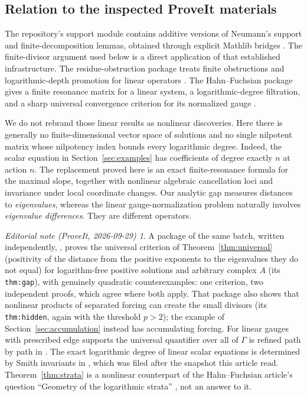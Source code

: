 \documentclass[11pt,a4paper]{article}
\numberwithin{equation}{section}
\theoremstyle{definition}
\theoremstyle{remark}
\newtheorem*{ednote}{Editorial note (ProveIt, 2026-09-29)}
\newcommand{\G}{\Gamma}
\begin{document}
\subsection{Relation to the inspected ProveIt materials}
The repository's support module contains additive versions of Neumann's
support and finite-decomposition lemmas, obtained through explicit
Mathlib bridges \cite{repo-support}. The finite-divisor argument used
below is a direct application of that established infrastructure.
The residue-obstruction package treats finite obstructions and
logarithmic-depth promotion for linear operators
\cite{repo-residue}. The Hahn--Fuchsian package gives a finite resonance
matrix for a linear system, a logarithmic-degree filtration, and a sharp
universal convergence criterion for its normalized gauge
\cite{repo-fuchsian}.

We do not rebrand those linear results as nonlinear discoveries. Here
there is generally no finite-dimensional vector space of solutions and
no single nilpotent matrix whose nilpotency index bounds every
logarithmic degree. Indeed, the scalar equation in
Section~\ref{sec:examples} has coefficients of degree exactly \(n\) at
action \(n\). The replacement proved here is an exact finite-resonance
formula for the maximal slope, together with nonlinear algebraic
cancellation loci and invariance under local coordinate changes.
Our analytic gap measures distances to \emph{eigenvalues}, whereas the
linear gauge-normalization problem naturally involves
\emph{eigenvalue differences}. They are different operators.
\begin{ednote}
A package of the same batch, written independently,
, proves the
universal criterion of Theorem~\ref{thm:universal} (positivity of the
distance from the positive exponents to the eigenvalues they do not equal)
for logarithm-free positive solutions and arbitrary complex \(A\) (its
\texttt{thm:gap}), with genuinely quadratic counterexamples: one criterion,
two independent proofs, which agree where both apply. That package also
shows that nonlinear products of separated forcing can create the small
divisors (its \texttt{thm:hidden}, again with the threshold \(p>2\)); the
example of Section~\ref{sec:accumulation} instead has accumulating forcing.
For linear gauges with prescribed edge supports the universal quantifier
over all of \(\G\) is refined path by path in
. The exact logarithmic
degree of linear scalar equations is determined by Smith invariants in
, which was filed after
the snapshot this article read. Theorem~\ref{thm:strata} is a nonlinear
counterpart of the Hahn--Fuchsian article's question ``Geometry of the
logarithmic strata'' \cite{repo-fuchsian}, not an answer to it.
\end{ednote}
\end{document}
